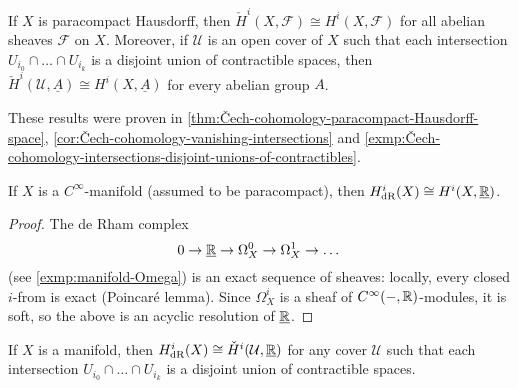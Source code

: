 \begin{prop}\label{prop:comparison-sheaf-cohomology-Čech-cohomology}
If \(X\) is paracompact Hausdorff, then \(\check{H}^i(X,\mathcal F)\cong H^i(X,\mathcal F)\) for all abelian sheaves \(\mathcal F\) on \(X\).
Moreover, if \(\mathcal U\) is an open cover of \(X\) such that each intersection \(U_{i_0}\cap\dots\cap U_{i_k}\) is a disjoint union of contractible spaces, then \(\check{H}^i(\mathcal U,\underline{A})\cong H^i(X,\underline{A})\) for every abelian group \(A\).
\end{prop}
These results were proven in \cref{thm:Čech-cohomology-paracompact-Hausdorff-space}, \cref{cor:Čech-cohomology-vanishing-intersections} and \cref{exmp:Čech-cohomology-intersections-disjoint-unions-of-contractibles}.

\begin{prop}\label{prop:comparison-de-Rham-cohomology-sheaf-cohomology}
If \(X\) is a \(C^\infty\)-manifold (assumed to be paracompact), then \(H^i_{\smash{\textup{dR}}}(X)\cong H^i(X,\underline{\mathbb{R}})\).
\end{prop}
\begin{proof}
The de Rham complex
\[ 0\to\underline{\mathbb{R}}\to \Omega^0_X \to \Omega^1_X \to \dots \]
(see \cref{exmp:manifold-Omega}) is an exact sequence of sheaves: locally, every closed \(i\)-from is exact (Poincaré lemma).
Since \(\Omega^i_X\) is a sheaf of \(C^\infty(-,\mathbb{R})\)-modules, it is soft, so the above is an acyclic resolution of \(\underline{\mathbb{R}}\).
\end{proof}

\begin{prop}[name={\cite[Theorem~8.9]{bottDifferentialFormsAlgebraic1982}}]\label{prop:comparison-de-Rham-cohomology-Čech-chomology}
If \(X\) is a manifold, then \(H^i_{\smash{\textup{dR}}}(X)\cong\check{H}^i(\mathcal U,\underline{\mathbb{R}})\) for any cover \(\mathcal U\) such that each intersection \(U_{i_0}\cap \dots\cap U_{i_k}\) is a disjoint union of contractible spaces.
\end{prop}

